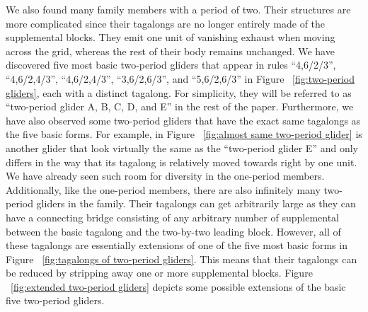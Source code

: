 \documentclass[12pt]{article}
\numberwithin{figure}{section} %
\begin{document}
We also found many family members with a period of two. Their structures are more complicated since their tagalongs are no longer entirely made of the supplemental blocks. They emit one unit of vanishing exhaust when moving across the grid, whereas the rest of their body remains unchanged. We have discovered five most basic two-period gliders that appear in rules “4,6/2/3”, “4,6/2,4/3”, “4,6/2,4/3”, “3,6/2,6/3”, and “5,6/2,6/3” in Figure ~\ref{fig:two-period gliders}, each with a distinct tagalong. For simplicity, they will be referred to as “two-period glider A, B, C, D, and E” in the rest of the paper. Furthermore, we have also observed some two-period gliders that have the exact same tagalongs as the five basic forms. For example, in Figure ~\ref{fig:almost same two-period glider} is another glider that look virtually the same as the “two-period glider E” and only differs in the way that its tagalong is relatively moved towards right by one unit. We have already seen such room for diversity in the one-period members. Additionally, like the one-period members, there are also infinitely many two-period gliders in the family. Their tagalongs can get arbitrarily large as they can have a connecting bridge consisting of any arbitrary number of supplemental between the basic tagalong and the two-by-two leading block. However, all of these tagalongs are essentially extensions of one of the five most basic forms in Figure ~\ref{fig:tagalongs of two-period gliders}. This means that their tagalongs can be reduced by stripping away one or more supplemental blocks. Figure ~\ref{fig:extended two-period gliders} depicts some possible extensions of the basic five two-period gliders. 
\end{document}

